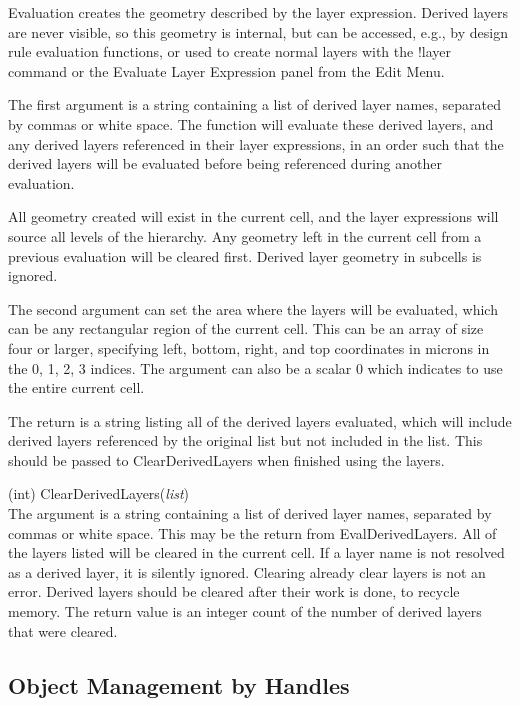 \begin{description}
Evaluation creates the geometry described by the layer expression. 
Derived layers are never visible, so this geometry is internal, but
can be accessed, e.g., by design rule evaluation functions, or used to
create normal layers with the {\cb !layer} command or the {\cb
Evaluate Layer Expression} panel from the {\cb Edit Menu}.

The first argument is a string containing a list of derived layer
names, separated by commas or white space.  The function will evaluate
these derived layers, and any derived layers referenced in their layer
expressions, in an order such that the derived layers will be
evaluated before being referenced during another evaluation.

All geometry created will exist in the current cell, and the layer
expressions will source all levels of the hierarchy.  Any geometry
left in the current cell from a previous evaluation will be cleared
first.  Derived layer geometry in subcells is ignored.

The second argument can set the area where the layers will be
evaluated, which can be any rectangular region of the current cell. 
This can be an array of size four or larger, specifying left, bottom,
right, and top coordinates in microns in the 0, 1, 2, 3 indices.  The
argument can also be a scalar 0 which indicates to use the entire
current cell.

The return is a string listing all of the derived layers evaluated,
which will include derived layers referenced by the original list but
not included in the list.  This should be passed to {\vt
ClearDerivedLayers} when finished using the layers.

\item{(int) \vt ClearDerivedLayers({\it list\/})}\\
The argument is a string containing a list of derived layer names,
separated by commas or white space.  This may be the return from {\vt
EvalDerivedLayers}.  All of the layers listed will be cleared in the
current cell.  If a layer name is not resolved as a derived layer, it
is silently ignored.  Clearing already clear layers is not an error. 
Derived layers should be cleared after their work is done, to recycle
memory.  The return value is an integer count of the number of derived
layers that were cleared.

\end{description}

\subsection{Object Management by Handles}
\label{objmanh}

